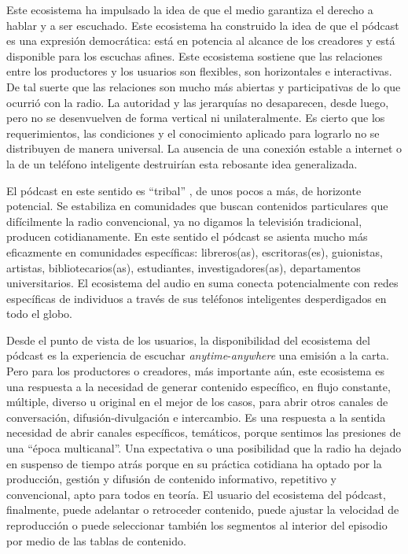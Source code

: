 \documentclass[
  spanish,
  11pt,
  a4paper,
]{scrbook}
\begin{document}
Este ecosistema ha impulsado la idea de que el medio garantiza el
derecho a hablar y a ser escuchado. Este ecosistema ha construido la
idea de que el pódcast es una expresión democrática: está en potencia al
alcance de los creadores y está disponible para los escuchas afines.
Este ecosistema sostiene que las relaciones entre los productores y los
usuarios son flexibles, son horizontales e interactivas. De tal suerte
que las relaciones son mucho más abiertas y participativas de lo que
ocurrió con la radio. La autoridad y las jerarquías no desaparecen,
desde luego, pero no se desenvuelven de forma vertical ni
unilateralmente. Es cierto que los requerimientos, las condiciones y el
conocimiento aplicado para lograrlo no se distribuyen de manera
universal. La ausencia de una conexión estable a internet o la de un
teléfono inteligente destruirían esta rebosante idea generalizada.

El pódcast en este sentido es ``tribal''
\autocite{EspinosadelosMonteros2021}, de unos pocos a más, de horizonte
potencial. Se estabiliza en comunidades que buscan contenidos
particulares que difícilmente la radio convencional, ya no digamos la
televisión tradicional, producen cotidianamente. En este sentido el
pódcast se asienta mucho más eficazmente en comunidades específicas:
libreros(as), escritoras(es), guionistas, artistas, bibliotecarios(as),
estudiantes, investigadores(as), departamentos universitarios. El
ecosistema del audio en suma conecta potencialmente con redes
específicas de individuos a través de sus teléfonos inteligentes
desperdigados en todo el globo.

Desde el punto de vista de los usuarios, la disponibilidad del
ecosistema del pódcast es la experiencia de escuchar
\emph{anytime}-\emph{anywhere} una emisión a la carta. Pero para los
productores o creadores, más importante aún, este ecosistema es una
respuesta a la necesidad de generar contenido específico, en flujo
constante, múltiple, diverso u original en el mejor de los casos, para
abrir otros canales de conversación, difusión-divulgación e intercambio.
Es una respuesta a la sentida necesidad de abrir canales específicos,
temáticos, porque sentimos las presiones de una ``época multicanal''.
Una expectativa o una posibilidad que la radio ha dejado en suspenso de
tiempo atrás porque en su práctica cotidiana ha optado por la
producción, gestión y difusión de contenido informativo, repetitivo y
convencional, apto para todos en teoría. El usuario del ecosistema del
pódcast, finalmente, puede adelantar o retroceder contenido, puede
ajustar la velocidad de reproducción o puede seleccionar también los
segmentos al interior del episodio por medio de las tablas de contenido.
\end{document}
